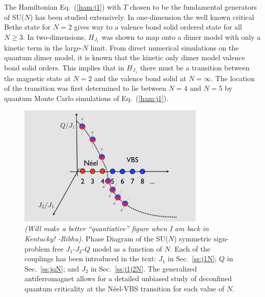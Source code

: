 \documentclass[aps,prb,groupedaddress,twocolumn]{revtex4}
\begin{document}
The Hamiltonian Eq.~(\ref{ham:j1}) with $T$ chosen to be the
fundamental generators of SU($N$) has been studied extensively. In
one-dimension the well known critical Bethe state for $N=2$ gives way to a valence bond solid
ordered state for all $N\geq 3$.   In two-dimensions, $H_{J_1}$ was shown to map onto a dimer model
with only a kinetic term
in the large-$N$ limit. From direct numerical simulations
on the quantum dimer model, it is known that the kinetic only dimer model
valence bond solid orders.  This implies that in $H_{J_1}$ there must be a transition
between the magnetic state at $N=2$ and the valence bond solid at
$N=\infty$.  The location of the transition was first
determined to lie between $N=4$ and $N=5$ by quantum Monte Carlo
simulations of Eq.~(\ref{ham:j1}).


\begin{figure}
\includegraphics[width=3.5in]{pdj1j2q.pdf}
  \caption{ \label{fig:pdj1j2q} {\em (Will make a better ``quantiative''
      figure when  I am back in Kentucky! -Ribhu)}. Phase Diagram of the
    SU($N$) symmetric sign-problem free
    $J_1$-$J_2$-$Q$ model as a function of $N$. Each of the couplings has been introduced
    in the text: $J_1$ in Sec.~\ref{ss:j1N}; $Q$ in Sec.~\ref{ss:jqN};
  and $J_2$ in Sec.~\ref{ss:j1j2N}. The generalized antiferromagnet
  allows for a detailed unbiased study of deconfined quantum
  criticality at the N\'eel-VBS transition for each value of $N$. }
\end{figure}
\end{document}
